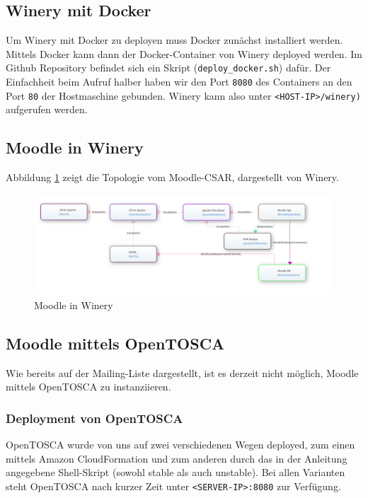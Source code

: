 \subsection{Winery mit Docker}

Um Winery mit Docker zu deployen muss Docker zunächst installiert werden. Mittels Docker kann dann der Docker-Container von Winery deployed werden. Im Github Repository befindet sich ein Skript (\verb|deploy_docker.sh|) dafür. Der Einfachheit beim Aufruf halber haben wir den Port \verb|8080| des Containers an den Port \verb|80| der Hostmaschine gebunden. Winery kann also unter \verb|<HOST-IP>/winery)| aufgerufen werden.


\subsection{Moodle in Winery}
Abbildung \ref{fig:moodle_winery} zeigt die Topologie vom Moodle-CSAR, dargestellt von Winery.

\begin{figure}
\centering
\includegraphics[width=\textwidth]{winery_moodle.png}
\caption{Moodle in Winery}
\label{fig:moodle_winery}
\end{figure}
\subsection{Moodle mittels OpenTOSCA}
Wie bereits auf der Mailing-Liste dargestellt, ist es derzeit nicht möglich, Moodle mittels OpenTOSCA zu instanziieren.
\subsubsection{Deployment von OpenTOSCA}
OpenTOSCA wurde von uns auf zwei verschiedenen Wegen deployed, zum einen mittels Amazon CloudFormation und zum anderen durch das in der Anleitung angegebene Shell-Skript (sowohl stable als auch unstable). Bei allen Varianten steht OpenTOSCA nach kurzer Zeit unter \verb|<SERVER-IP>:8080| zur Verfügung.
